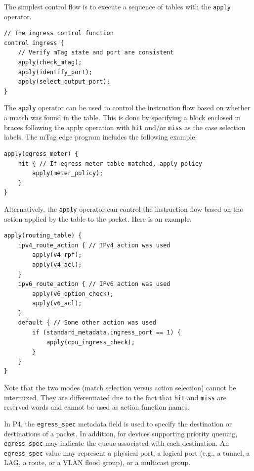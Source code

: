 \documentclass[12pt]{article}
\begin{document}
The simplest control flow is to execute a sequence of tables with the \texttt{apply} operator.

\begin{lstlisting}[keywords={},frame=single,escapechar=\@]
// The ingress control function
control ingress {
    // Verify mTag state and port are consistent
    apply(check_mtag);
    apply(identify_port);
    apply(select_output_port);
}
\end{lstlisting}


The \texttt{apply} operator can be used to control the instruction flow based on whether
a match was found in the table. This is done by specifying a block enclosed
in braces following the apply operation with \texttt{hit} and/or \texttt{miss} as the case
selection labels.  The mTag edge program includes the following example:

\begin{lstlisting}[keywords={},frame=single,escapechar=\@]
apply(egress_meter) {
    hit { // If egress meter table matched, apply policy
        apply(meter_policy);
    }
}
\end{lstlisting}


Alternatively, the \texttt{apply} operator can control the instruction flow based
on the action applied by the table to the packet. Here is an example.

\begin{lstlisting}[keywords={},frame=single,escapechar=\@]
apply(routing_table) {
    ipv4_route_action { // IPv4 action was used
        apply(v4_rpf);
        apply(v4_acl);
    }
    ipv6_route_action { // IPv6 action was used
        apply(v6_option_check);
        apply(v6_acl);
    }
    default { // Some other action was used
        if (standard_metadata.ingress_port == 1) {
            apply(cpu_ingress_check);
        }
    }
}
\end{lstlisting}


Note that the two modes (match selection versus action selection) cannot be
intermixed. They are differentiated due to the fact that \texttt{hit} and \texttt{miss} are
reserved words and cannot be used as action function names.


In P4, the \texttt{egress_spec} metadata field is used to specify the destination
or destinations of a packet. In addition, for devices supporting priority
queuing, \texttt{egress_spec} may indicate the queue associated with each destination.
An \texttt{egress_spec} value may represent a physical port, a logical port (e.g.,
a tunnel, a LAG, a route, or a VLAN flood group), or a multicast group.
\end{document}
